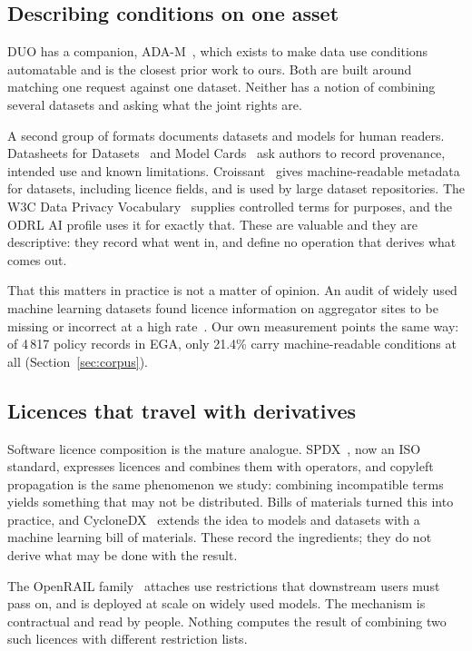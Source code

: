 \documentclass[sigconf,anonymous,review]{acmart}
\begin{document}
\subsection{Describing conditions on one asset}

DUO has a companion, ADA-M~\cite{adam}, which exists to make data use conditions
automatable and is the closest prior work to ours. Both are built around matching
one request against one dataset. Neither has a notion of combining several
datasets and asking what the joint rights are.

A second group of formats documents datasets and models for human readers.
Datasheets for Datasets~\cite{datasheets} and Model Cards~\cite{modelcards} ask
authors to record provenance, intended use and known limitations.
Croissant~\cite{croissant} gives machine-readable metadata for datasets,
including licence fields, and is used by large dataset repositories. The W3C Data
Privacy Vocabulary~\cite{dpv} supplies controlled terms for purposes, and the ODRL
AI profile uses it for exactly that. These are valuable and they are descriptive:
they record what went in, and define no operation that derives what comes out.

That this matters in practice is not a matter of opinion. An audit of widely used
machine learning datasets found licence information on aggregator sites to be
missing or incorrect at a high rate~\cite{provenance}. Our own measurement points
the same way: of 4\,817 policy records in EGA, only 21.4\% carry machine-readable
conditions at all (Section~\ref{sec:corpus}).

\subsection{Licences that travel with derivatives}

Software licence composition is the mature analogue. SPDX~\cite{spdx}, now an ISO
standard, expresses licences and combines them with operators, and copyleft
propagation is the same phenomenon we study: combining incompatible terms yields
something that may not be distributed. Bills of materials turned this into
practice, and CycloneDX~\cite{cyclonedx} extends the idea to models and datasets
with a machine learning bill of materials. These record the ingredients; they do
not derive what may be done with the result.

The OpenRAIL family~\cite{openrail} attaches use restrictions that downstream
users must pass on, and is deployed at scale on widely used models. The mechanism
is contractual and read by people. Nothing computes the result of combining two
such licences with different restriction lists.
\end{document}
